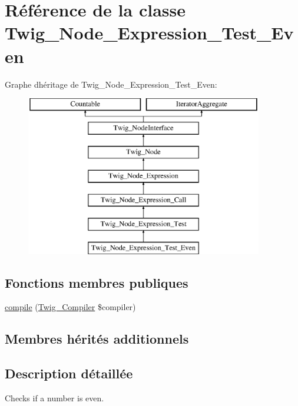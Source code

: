 \hypertarget{class_twig___node___expression___test___even}{}\section{Référence de la classe Twig\+\_\+\+Node\+\_\+\+Expression\+\_\+\+Test\+\_\+\+Even}
\label{class_twig___node___expression___test___even}
Graphe d\textquotesingle{}héritage de Twig\+\_\+\+Node\+\_\+\+Expression\+\_\+\+Test\+\_\+\+Even\+:\begin{figure}[H]
\begin{center}
\leavevmode
\includegraphics[height=7.000000cm]{class_twig___node___expression___test___even}
\end{center}
\end{figure}
\subsection*{Fonctions membres publiques}
\begin{DoxyCompactItemize}
\item 
\hyperlink{class_twig___node___expression___test___even_a4e0faa87c3fae583620b84d3607085da}{compile} (\hyperlink{class_twig___compiler}{Twig\+\_\+\+Compiler} \$compiler)
\end{DoxyCompactItemize}
\subsection*{Membres hérités additionnels}


\subsection{Description détaillée}
Checks if a number is even.



